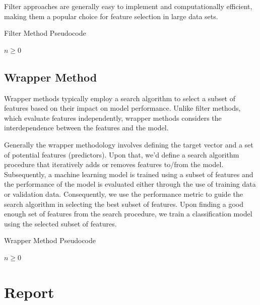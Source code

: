 \documentclass[12pt,twoside,a4paper]{article}
\begin{document}
Filter approaches are generally easy to implement and computationally efficient, making them a popular choice for feature selection in large data sets.

\begin{algorithm}
\caption{Filter Method Pseudocode}\label{alg:fmp}
\begin{algorithmic}

\Require $n \geq 0$

\vspace{-20pt}
\end{algorithmic}
\end{algorithm}

\subsection{Wrapper Method}

Wrapper methods typically employ a search algorithm to select a subset of features based on their impact on model performance. Unlike filter methods, which evaluate features independently, wrapper methods considers the interdependence between the features and the model.

Generally the wrapper methodology involves defining the target vector and a set of potential features (predictors). Upon that, we'd define a search algorithm procedure that iteratively adds or removes features to/from the model. Subsequently, a machine learning model is trained using a subset of features and the performance of the model is evaluated either through the use of training data or validation data. Consequently, we use the performance metric to guide the search algorithm in selecting the best subset of features. Upon finding a good enough set of features from the search procedure, we train a classification model using the selected subset of features.

\begin{algorithm}
\caption{Wrapper Method Pseudocode}\label{alg:fmp}
\begin{algorithmic}

\Require $n \geq 0$

\vspace{-20pt}
\end{algorithmic}
\end{algorithm}

\section{Report}
\end{document}
